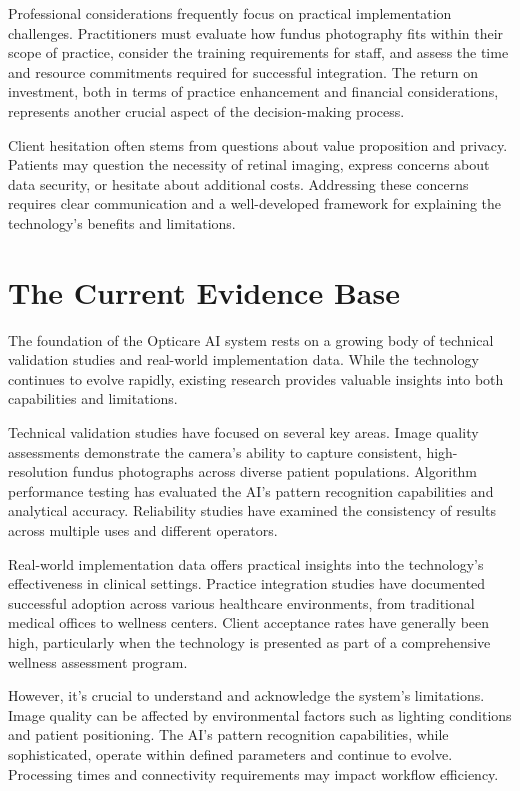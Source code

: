 \documentclass[
  Letterpaper,
]{scrbook}
\begin{document}
Professional considerations frequently focus on practical implementation
challenges. Practitioners must evaluate how fundus photography fits
within their scope of practice, consider the training requirements for
staff, and assess the time and resource commitments required for
successful integration. The return on investment, both in terms of
practice enhancement and financial considerations, represents another
crucial aspect of the decision-making process.

Client hesitation often stems from questions about value proposition and
privacy. Patients may question the necessity of retinal imaging, express
concerns about data security, or hesitate about additional costs.
Addressing these concerns requires clear communication and a
well-developed framework for explaining the technology's benefits and
limitations.

\section{The Current Evidence Base}\label{the-current-evidence-base}

The foundation of the Opticare AI system rests on a growing body of
technical validation studies and real-world implementation data. While
the technology continues to evolve rapidly, existing research provides
valuable insights into both capabilities and limitations.

Technical validation studies have focused on several key areas. Image
quality assessments demonstrate the camera's ability to capture
consistent, high-resolution fundus photographs across diverse patient
populations. Algorithm performance testing has evaluated the AI's
pattern recognition capabilities and analytical accuracy. Reliability
studies have examined the consistency of results across multiple uses
and different operators.

Real-world implementation data offers practical insights into the
technology's effectiveness in clinical settings. Practice integration
studies have documented successful adoption across various healthcare
environments, from traditional medical offices to wellness centers.
Client acceptance rates have generally been high, particularly when the
technology is presented as part of a comprehensive wellness assessment
program.

However, it's crucial to understand and acknowledge the system's
limitations. Image quality can be affected by environmental factors such
as lighting conditions and patient positioning. The AI's pattern
recognition capabilities, while sophisticated, operate within defined
parameters and continue to evolve. Processing times and connectivity
requirements may impact workflow efficiency.
\end{document}
